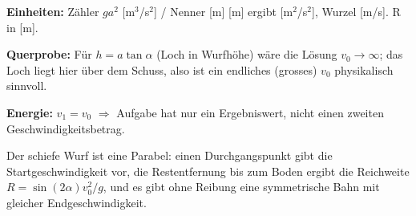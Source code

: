 \begin{kontrolle}
\textbf{Einheiten:} Z\"ahler $g a^2$ [m$^3$/s$^2$] / Nenner [m] [m] ergibt
[m$^2$/s$^2$], Wurzel [m/s]. R in [m]. \checkmark

\textbf{Querprobe:} F\"ur $h=a\tan\alpha$ (Loch in Wurfhöhe) w\"are die
L\"osung $v_0\to\infty$; das Loch liegt hier \"uber dem Schuss, also ist ein
endliches (grosses) $v_0$ physikalisch sinnvoll.

\textbf{Energie:} $v_1=v_0$ $\Rightarrow$ Aufgabe hat nur ein Ergebniswert,
nicht einen zweiten Geschwindigkeitsbetrag. \checkmark
\end{kontrolle}

\begin{merksatz}
Der schiefe Wurf ist eine Parabel: einen Durchgangspunkt gibt die
Startgeschwindigkeit vor, die Restentfernung bis zum Boden ergibt die
Reichweite $R=\sin(2\alpha)v_0^2/g$, und es gibt ohne Reibung eine
symmetrische Bahn mit gleicher Endgeschwindigkeit.
\end{merksatz}
